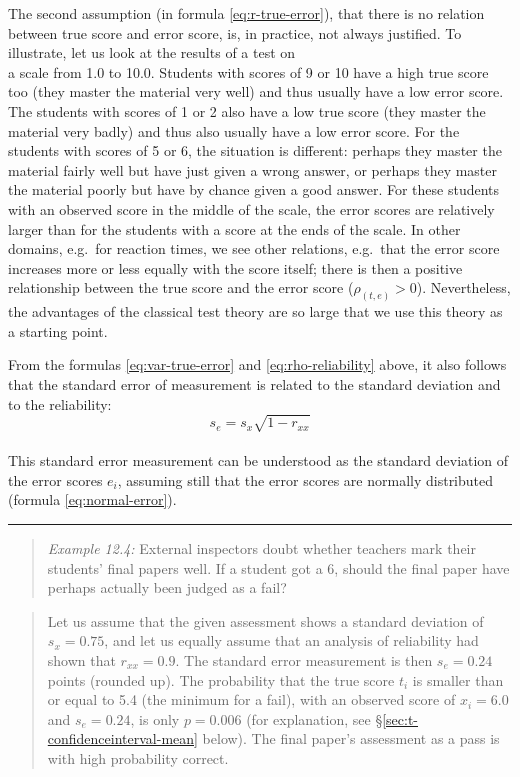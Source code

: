 \documentclass[
]{book}
\begin{document}
The second assumption (in formula \eqref{eq:r-true-error}), that there is no relation between
true score and error score, is, in practice, not always justified.
To illustrate, let us look at the results of a test on\\
a scale from 1.0 to 10.0. Students with scores of 9 or 10 have a high
true score too (they master the material very well) and thus usually have a low
error score. The students with scores of 1 or 2 also have a low true score
(they master the material very badly) and thus also usually have a low
error score. For the students with scores of 5 or 6,
the situation is different: perhaps they master the material fairly well
but have just given a wrong answer, or perhaps they master the material poorly but have by chance given a good answer. For these students with an observed
score in the middle of the scale, the error scores are relatively larger
than for the students with a score at the ends of the scale. In other domains,
e.g.~for reaction times, we see other relations, e.g.~that the error score increases
more or less equally with the score itself; there is then a positive relationship
between the true score and the error score (\(\rho_{(t,e)}>0\)). Nevertheless,
the advantages of the classical test theory are so large that we use this
theory as a starting point.

From the formulas \eqref{eq:var-true-error} and \eqref{eq:rho-reliability}
above, it also follows that the standard error of measurement is related to the
standard deviation and to the reliability:
\begin{equation}
   \label{eq:standard-error-measurement}
    s_e = s_x \sqrt{1-r_{xx}}
\end{equation}\\
This standard error measurement can be understood
as the standard deviation of the error scores \(e_i\), assuming still that
the error scores are normally distributed (formula \eqref{eq:normal-error}).

\begin{center}\rule{0.5\linewidth}{0.5pt}\end{center}

\begin{quote}
\emph{Example 12.4:}
External inspectors doubt whether teachers mark their students' final
papers well. If a student got a 6, should the final paper have perhaps actually
been judged as a fail?
\end{quote}

\begin{quote}
Let us assume that the given assessment shows a standard deviation
of \(s_x=0.75\), and let us equally assume that an analysis of reliability
had shown that \(r_{xx}=0.9\). The standard error measurement is then \(s_e = 0.24\)
points (rounded up). The probability that the true score \(t_i\) is smaller than
or equal to 5.4 (the minimum for a fail), with an observed
score of \(x_i=6.0\) and \(s_e=0.24\), is only \(p=0.006\) (for explanation,
see §\ref{sec:t-confidenceinterval-mean} below). The
final paper's assessment as a pass is with high probability correct.
\end{quote}
\end{document}

